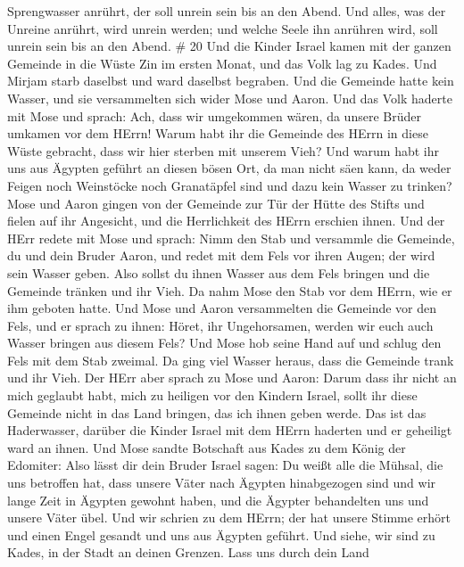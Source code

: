Sprengwasser anrührt, der soll unrein sein bis an den Abend.
 Und alles, was der Unreine anrührt, wird unrein werden;
und welche Seele ihn anrühren wird, soll unrein sein bis an den Abend.
\# 20  Und die Kinder Israel kamen mit der ganzen Gemeinde
in die Wüste Zin im ersten Monat, und das Volk lag zu Kades. Und Mirjam
starb daselbst und ward daselbst begraben.  Und die Gemeinde
hatte kein Wasser, und sie versammelten sich wider Mose und Aaron.
 Und das Volk haderte mit Mose und sprach: Ach, dass wir
umgekommen wären, da unsere Brüder umkamen vor dem HErrn! 
Warum habt ihr die Gemeinde des HErrn in diese Wüste gebracht, dass wir
hier sterben mit unserem Vieh?  Und warum habt ihr uns aus
Ägypten geführt an diesen bösen Ort, da man nicht säen kann, da weder
Feigen noch Weinstöcke noch Granatäpfel sind und dazu kein Wasser zu
trinken?  Mose und Aaron gingen von der Gemeinde zur Tür der
Hütte des Stifts und fielen auf ihr Angesicht, und die Herrlichkeit des
HErrn erschien ihnen.  Und der HErr redete mit Mose und
sprach:  Nimm den Stab und versammle die Gemeinde, du und
dein Bruder Aaron, und redet mit dem Fels vor ihren Augen; der wird sein
Wasser geben. Also sollst du ihnen Wasser aus dem Fels bringen und die
Gemeinde tränken und ihr Vieh.  Da nahm Mose den Stab vor
dem HErrn, wie er ihm geboten hatte.  Und Mose und Aaron
versammelten die Gemeinde vor den Fels, und er sprach zu ihnen: Höret,
ihr Ungehorsamen, werden wir euch auch Wasser bringen aus diesem Fels?
 Und Mose hob seine Hand auf und schlug den Fels mit dem
Stab zweimal. Da ging viel Wasser heraus, dass die Gemeinde trank und
ihr Vieh.  Der HErr aber sprach zu Mose und Aaron: Darum
dass ihr nicht an mich geglaubt habt, mich zu heiligen vor den Kindern
Israel, sollt ihr diese Gemeinde nicht in das Land bringen, das ich
ihnen geben werde.  Das ist das Haderwasser, darüber die
Kinder Israel mit dem HErrn haderten und er geheiligt ward an ihnen.
 Und Mose sandte Botschaft aus Kades zu dem König der
Edomiter: Also lässt dir dein Bruder Israel sagen: Du weißt alle die
Mühsal, die uns betroffen hat,  dass unsere Väter nach
Ägypten hinabgezogen sind und wir lange Zeit in Ägypten gewohnt haben,
und die Ägypter behandelten uns und unsere Väter übel.  Und
wir schrien zu dem HErrn; der hat unsere Stimme erhört und einen Engel
gesandt und uns aus Ägypten geführt. Und siehe, wir sind zu Kades, in
der Stadt an deinen Grenzen.  Lass uns durch dein Land
